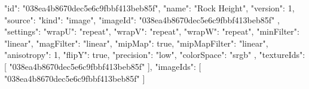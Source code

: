 {
  "id": "038ea4b8670dec5e6c9fbbf413beb85f",
  "name": "Rock Height",
  "version": 1,
  "source": {
    "kind": "image",
    "imageId": "038ea4b8670dec5e6c9fbbf413beb85f"
  },
  "settings": {
    "wrapU": "repeat",
    "wrapV": "repeat",
    "wrapW": "repeat",
    "minFilter": "linear",
    "magFilter": "linear",
    "mipMap": true,
    "mipMapFilter": "linear",
    "anisotropy": 1,
    "flipY": true,
    "precision": "low",
    "colorSpace": "srgb"
  },
  "textureIds": [
    "038ea4b8670dec5e6c9fbbf413beb85f"
  ],
  "imageIds": [
    "038ea4b8670dec5e6c9fbbf413beb85f"
  ]
}
